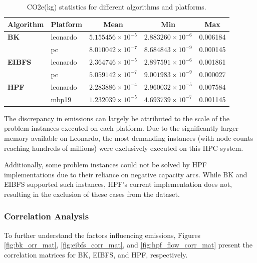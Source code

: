 \documentclass[a4paper,singleside,12pt]{report} %
\begin{document}
\begin{table}[h]
    \centering
    \begin{tabular}{llccc}
        \hline
        \textbf{Algorithm} & \textbf{Platform} & \textbf{Mean} & \textbf{Min} & \textbf{Max} \\
        \hline
        \textbf{BK} & leonardo & $5.155456 \times 10^{-5}$ & $2.883260 \times 10^{-6}$ & 0.006184 \\
                    & pc       & $8.010042 \times 10^{-7}$ & $8.684843 \times 10^{-9}$ & 0.000145 \\
        \hline
        \textbf{EIBFS} & leonardo & $2.364746 \times 10^{-5}$ & $2.897591 \times 10^{-6}$ & 0.001861 \\
                       & pc       & $5.059142 \times 10^{-7}$ & $9.001983 \times 10^{-9}$ & 0.000027 \\
        \hline
        \textbf{HPF} & leonardo & $2.283886 \times 10^{-4}$ & $2.960032 \times 10^{-5}$ & 0.007584 \\
                     & mbp19    & $1.232039 \times 10^{-5}$ & $4.693739 \times 10^{-7}$ & 0.001145 \\
        \bottomrule
    \end{tabular}
    \caption{CO2e(kg) statistics for different algorithms and platforms.}
    \label{tab:co2_benchmark}
\end{table}

The discrepancy in emissions can largely be attributed to the scale of the problem instances executed on each platform. Due to the significantly larger memory available on Leonardo, 
the most demanding instances (with node counts reaching hundreds of millions) were exclusively executed on this HPC system. 

Additionally, some problem instances could not be solved by HPF implementations due to their reliance on negative capacity arcs. While BK and EIBFS supported such instances, HPF's 
current implementation does not, resulting in the exclusion of these cases from the dataset.

\subsubsection{Correlation Analysis}

To further understand the factors influencing emissions, Figures \ref{fig:bk_orr_mat}, \ref{fig:eibfs_corr_mat}, and \ref{fig:hpf_flow_corr_mat} present the correlation matrices for BK, 
EIBFS, and HPF, respectively. 
\end{document}
